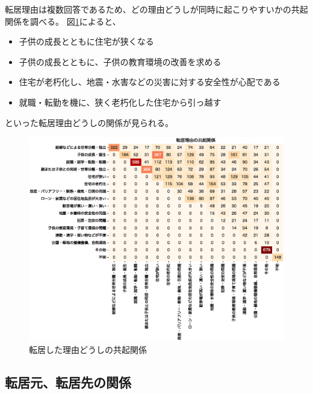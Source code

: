 \documentclass[a4paper,12pt, uplatex]{jsbook}
\begin{document}
\clearpage
転居理由は複数回答であるため、どの理由どうしが同時に起こりやすいかの共起関係を調べる。
図\ref{fig:reasons_for_moving_combination}によると、
\begin{itemize}
  \item 子供の成長とともに住宅が狭くなる
  \item 子供の成長とともに、子供の教育環境の改善を求める
  \item 住宅が老朽化し、地震・水害などの災害に対する安全性が心配である
  \item 就職・転勤を機に、狭く老朽化した住宅から引っ越す
\end{itemize}
といった転居理由どうしの関係が見られる。
%
\begin{figure}[htbp]
    \centering
    \includegraphics[width=\textwidth]{picture/転居理由_共起.eps}
    \caption{転居した理由どうしの共起関係}
    \label{fig:reasons_for_moving_combination}
\end{figure}

\clearpage
\subsection{転居元、転居先の関係}
\end{document}
